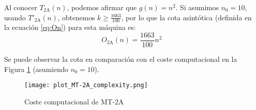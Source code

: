 Al conocer $T_{\mathrm{2A}}(n)$, podemos afirmar que $g(n) = n^2$. Si asumimos $n_0 = 10$, usando $T'_{\mathrm{2A}}(n)$, obtenemos $k \geq \frac{1663}{100}$, por lo que la cota asintótica (definida en la ecuación \ref{eq:On}) para esta máquina es:
\begin{equation}
    O_{\mathrm{2A}}(n) = \frac{1663}{100}n^2
\end{equation}

Se puede observar la cota en comparación con el coste computacional en la Figura \ref{fig:MT-2A_plot} (asumiendo $n_0 = 10$).


\begin{figure}[h]
    \centering
    \texttt{[image: plot\_MT-2A\_complexity.png]}
    \caption{Coste computacional de MT-2A}
    \label{fig:MT-2A_plot}
\end{figure}
